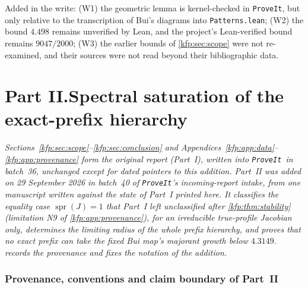 \documentclass[11pt,a4paper]{article}
\theoremstyle{definition}
\theoremstyle{remark}
\newcommand{\spr}{\operatorname{spr}}
\newcommand{\repo}{\texttt{ProveIt}}
\begin{document}
Added in the write: (W1) the geometric lemma is kernel-checked in \repo, but
only relative to the transcription of Bui's diagrams into
\texttt{Patterns.lean}; (W2) the bound $4.498$ remains unverified by Lean,
and the project's Lean-verified bound remains $9047/2000$; (W3) the earlier
bounds of \cref{kfp:sec:scope} were not re-examined, and their sources were
not read beyond their bibliographic data.

\clearpage
\setcounter{section}{11}
\renewcommand{\thesection}{\arabic{section}}
\renewcommand{\theHsection}{partII.\arabic{section}}
\part*{Part II.\quad Spectral saturation of the exact-prefix hierarchy}

\noindent\emph{Sections~\ref{kfp:sec:scope}--\ref{kfp:sec:conclusion} and
Appendices~\ref{kfp:app:data}--\ref{kfp:app:provenance} form the original
report (Part~I), written into \repo\ in batch~36, unchanged except for dated
pointers to this addition. Part~II was added on 29 September 2026 in
batch~40 of \repo's incoming-report intake, from one manuscript written
against the state of Part~I printed here. It classifies the equality case
$\spr(J)=1$ that Part~I left unclassified after \cref{kfp:thm:stability}
(limitation N9 of \cref{kfp:app:provenance}), \emph{for an irreducible
true-profile Jacobian only}, determines the limiting radius of the whole
prefix hierarchy, and proves that no exact prefix can take the fixed Bui
map's majorant growth below $4.3149$.  records
the provenance and fixes the notation of the addition.}

\section{Provenance, conventions and claim boundary of Part~II}
\label{kfp:sat:sec:source}
\end{document}
